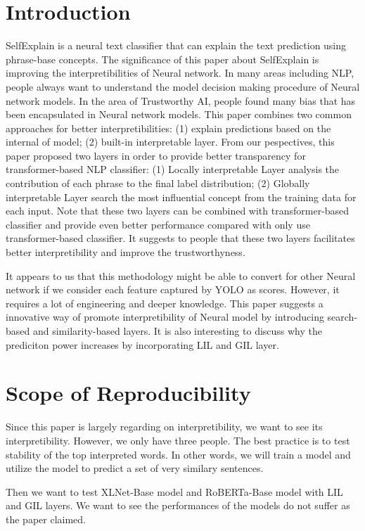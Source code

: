 \documentclass{article}
\begin{document}
\section{Introduction}

SelfExplain is a neural text classifier that can explain the text prediction using phrase-base concepts.
The significance of this paper about SelfExplain is improving the interpretibilities of Neural 
network. In many areas including NLP, people always want to understand the model decision making
procedure of Neural network models. In the area of Trustworthy AI, people found many bias 
that has been encapsulated in Neural network models. This paper combines two common approaches 
for better interpretibilities: (1) explain predictions based on the internal of model; (2) built-in 
interpretable layer. From our pespectives, this paper proposed two layers in order to provide 
better transparency for transformer-based NLP classifier: (1) Locally interpretable Layer 
analysis the contribution of each phrase to the final label distribution; (2) Globally interpretable 
Layer search the most influential concept from the training data for each input. Note that 
these two layers can be combined with transformer-based classifier and provide even better 
performance compared with only use transformer-based classifier. It suggests to people that 
these two layers facilitates better interpretibility and improve the trustworthyness.

It appears to us that this methodology might be able to convert for other Neural network if we 
consider each feature captured by YOLO as scores. However, it requires a lot of engineering and 
deeper knowledge. This paper suggests a innovative way of promote interpretibility of Neural 
model by introducing search-based and similarity-based layers. It is also interesting to discuss 
why the prediciton power increases by incorporating LIL and GIL layer.

\section{Scope of Reproducibility}

Since this paper is largely regarding on interpretibility, we want to see its interpretibility. However,
we only have three people. The best practice is to test stability of the top interpreted words.
In other words, we will train a model and utilize the model to predict a set of very similary sentences.

Then we want to test XLNet-Base model and RoBERTa-Base model with LIL and GIL layers. We want to see 
the performances of the models do not suffer as the paper claimed.
\end{document}
